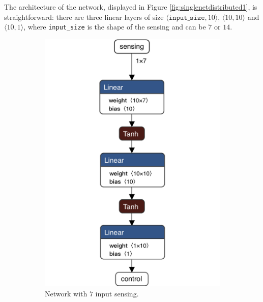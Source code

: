 The architecture of the network, displayed in Figure 
\ref{fig:singlenetdistributed1}, is straightforward: there are three linear layers of 
size $\langle\mathtt{input\_size}, 10\rangle$,  $\langle 10, 
10\rangle$ and $\langle 10, 1\rangle$, where \texttt{input\_size} is the 
shape of the sensing and can be $7$ or $14$.
\begin{figure}[htb]
	\centering
	\begin{subfigure}[h]{0.495\textwidth}
		\centering
		\includegraphics[width=.8\textwidth]{contents/images/task1distributed@4x}%
		\caption{Network with $7$ input sensing.}
		\label{fig:singlenet-d7distributed1}
	\end{subfigure}
	\hfill
	\begin{subfigure}[h]{0.495\textwidth}
		\centering

\end{subfigure}
\end{figure}
